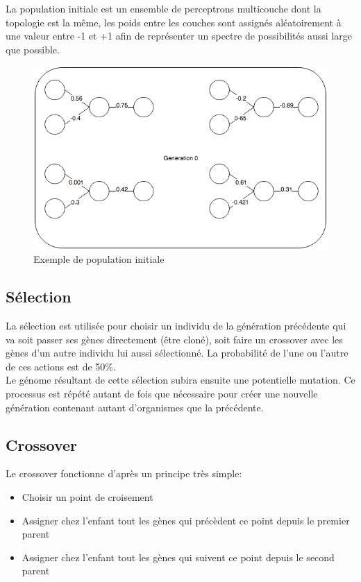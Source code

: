 \documentclass{article}
\begin{document}
La population initiale est un ensemble de perceptrons multicouche dont la topologie est la même, les poids entre les couches sont assignés aléatoirement à une valeur entre -1 et +1 afin de représenter un spectre de possibilités aussi large que possible.
\begin{figure}[h]
\begin{center}
	\includegraphics[scale=0.6]{gen0mlp.png} 
	\caption{Exemple de population initiale}
\end{center}
\end{figure}

\subsection{Sélection}

La sélection est utilisée pour choisir un individu de la génération précédente qui va soit passer ses gènes directement (être cloné), soit faire un crossover avec les gènes d'un autre individu lui aussi sélectionné. La probabilité de l'une ou l'autre de ces actions est de 50\%.\\
Le génome résultant de cette sélection subira ensuite une potentielle mutation. Ce processus est répété autant de fois que nécessaire pour créer une nouvelle génération contenant autant d'organismes que la précédente.

\subsection{Crossover}

Le crossover fonctionne d'après un principe très simple:\\
\begin{itemize}
\item Choisir un point de croisement
\item Assigner chez l'enfant tout les gènes qui précèdent ce point depuis le premier parent
\item Assigner chez l'enfant tout les gènes qui suivent ce point depuis le second parent
\end{itemize}
\end{document}
